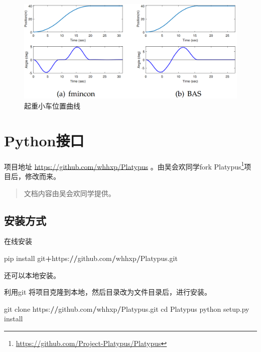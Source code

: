 \documentclass[]{ctexbook}
\newenvironment{Shaded}{\begin{snugshade}}{\end{snugshade}}
\newcommand{\OperatorTok}[1]{\textcolor[rgb]{0.81,0.36,0.00}{\textbf{#1}}}
\newcommand{\NormalTok}[1]{#1}
\renewcommand{\href}[2]{#2\footnote{\url{#1}}}
\begin{document}
\begin{figure}

{\centering \includegraphics[width=0.7\linewidth]{img/ex2_3} 

}

\caption{起重小车位置曲线}\label{fig:ex2position}
\end{figure}

\chapter{Python接口}\label{python}

项目地址 \url{https://github.com/whhxp/Platypus} 。由吴会欢同学fork
\href{https://github.com/Project-Platypus/Platypus}{Platypus}项目后，修改而来。

\begin{quote}
文档内容由吴会欢同学提供。
\end{quote}

\section{安装方式}

在线安装

\begin{Shaded}
\begin{Highlighting}[]
\NormalTok{pip install git}\OperatorTok{+}\NormalTok{https:}\OperatorTok{//}\NormalTok{github.com}\OperatorTok{/}\NormalTok{whhxp}\OperatorTok{/}\NormalTok{Platypus.git}
\end{Highlighting}
\end{Shaded}

还可以本地安装。

利用git 将项目克隆到本地，然后目录改为文件目录后，进行安装。

\begin{Shaded}
\begin{Highlighting}[]
\NormalTok{git clone https:}\OperatorTok{//}\NormalTok{github.com}\OperatorTok{/}\NormalTok{whhxp}\OperatorTok{/}\NormalTok{Platypus.git}
\NormalTok{cd Platypus}
\NormalTok{python setup.py install}
\end{Highlighting}
\end{Shaded}
\end{document}
